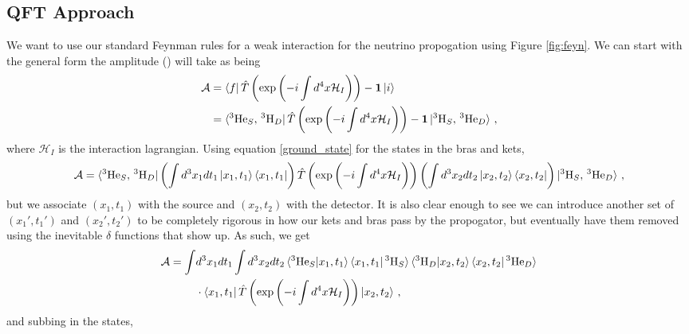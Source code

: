 \documentclass[10pt]{article}
\begin{document}
\subsection{QFT Approach}
We want to use our standard Feynman rules for a weak interaction for the neutrino propogation using Figure \ref{fig:feyn}. We can start with the general form the amplitude (\cite{Beuthe_2003}) will take as being
\begin{align}
  \mathcal{A} & = \bra{f}\hat{T}\left(\exp\left(-i\int d^{4}x\mathcal{H}_{I}\right)\right) - \bm{1}\ket{i} \\
  & = \bra{^{3}\text{He}_{S},\, ^{3}\text{H}_{D}}\hat{T}\left(\exp\left(-i\int d^{4}x\mathcal{H}_{I}\right)\right) - \bm{1}\ket{^{3}\text{H}_{S},\, ^{3}\text{He}_{D}}\, ,
\end{align}
where $\mathcal{H}_{I}$ is the interaction lagrangian. Using equation \ref{ground_state} for the states in the bras and kets,
\begin{equation*}
  \mathcal{A} = \bra{^{3}\text{He}_{S},\, ^{3}\text{H}_{D}}\left(\int d^{3}x_{1}dt_{1}\ket{x_{1},t_{1}}\bra{x_{1},t_{1}}\right)\hat{T}\left(\exp\left(-i\int d^{4}x\mathcal{H}_{I}\right)\right)\left(\int d^{3}x_{2}dt_{2}\ket{x_{2},t_{2}}\bra{x_{2},t_{2}}\right)\ket{^{3}\text{H}_{S},\, ^{3}\text{He}_{D}}\, ,
\end{equation*}
but we associate $(x_{1},t_{1})$ with the source and $(x_{2},t_2)$ with the detector. It is also clear enough to see we can introduce another set of $(x_{1}',t_{1}')$ and $(x_{2}', t_{2}')$ to be completely rigorous in how our kets and bras pass by the propogator, but eventually have them removed using the inevitable $\delta$ functions that show up. As such, we get
\begin{align*}
  \mathcal{A} = \int & d^{3}x_{1}dt_{1}\int d^{3}x_{2}dt_{2}\braket{^{3}\text{He}_{S}|x_{1},t_{1}}\braket{x_{1},t_{1}|\,^{3}\text{H}_{S}}\braket{^{3}\text{H}_{D}|x_{2},t_{2}}\braket{x_{2},t_{2}|\,^{3}\text{He}_{D}} \\
  & \cdot \bra{x_{1}, t_{1}}\hat{T}\left(\exp\left(-i\int d^{4}x\mathcal{H}_{I}\right)\right)\ket{x_{2},t_{2}} \, ,
\end{align*}
and subbing in the states,
\end{document}
